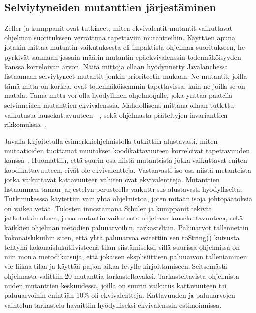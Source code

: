 \documentclass[finnish]{tktltiki2}
\begin{document}
\subsection{Selviytyneiden mutanttien järjestäminen}
Zeller ja kumppanit ovat tutkineet, miten ekvivalentit mutantit vaikuttavat ohjelman suoritukseen verrattuna tapettaviin mutantteihin. Käyttäen apuna jotakin mittaa mutantin vaikutuksesta eli impaktista ohjelman suoritukseen, he pyrkivät saamaan jossain määrin mutantin epäekvivalenssin todennäköisyyden kanssa korreloivan arvon. Näitä mittoja ollaan hyödynnetty Javalanchessa listaamaan selviytyneet mutantit jonkin prioriteetin mukaan. Ne mutantit, joilla tämä mitta on korkea, ovat todennäköisemmin tapettavissa, kuin ne joilla se on matala. Tämä mitta voi olla hyödyllinen ohjelmoijalle, joka yrittää päätellä selvinneiden mutanttien ekvivalenssia. Mahdollisena mittana ollaan tutkittu vaikutusta lausekattavuuteen~\cite{GrunSZ09}~\cite{SchulerZ10}, sekä ohjelmasta pääteltyjen invarianttien rikkomuksia~\cite{SchulerDZ09}.

Javalla kirjoitetulla esimerkkiohjelmistolla tutkittiin alustavasti, miten mutaatioiden tuottamat muutokset koodikattavuuteen korreloivat tapettavuuden kanssa~\cite{GrunSZ09}. Huomattiin, että suurin osa niistä mutanteista jotka vaikuttavat eniten koodikattavuuteen, eivät ole ekvivalentteja. Vastaavasti iso osa niistä mutanteista jotka vaikuttavat kattavuuteen vähiten ovat ekvivalentteja. Mutanttien listaaminen tämän järjestelyn perusteella vaikutti siis alustavasti hyödylliseltä. Tutkimukesssa käytettiin vain yhtä ohjelmistoa, joten mitään isoja johtopäätöksiä on vaikea vetää. Tulosten innostamana Schuler ja kumppanit tekivät jatkotutkimuksen, jossa mutantin vaikutusta ohjelman lausekattavuuteen, sekä kaikkien ohjelman metodien paluuarvoihin, tarkasteltiin. Paluuarvot tallennettin kokonaislukuihin siten, että yhtä paluuarvoa esitettiin sen toString() kutsusta tehtynä kokonaislukutiivisteenä tilan siistämiseksi, sillä suurissa ohjelmissa on niin monia metodikutsuja, että jokaisen eksplisiittisen paluuarvon tallentaminen vie liikaa tilaa ja käyttää paljon aikaa levylle kirjoittamiseen. Seitsemästä ohjelmasta valittiin 20 mutanttia tarkasteltavaksi. Tarkasteltavista ohjelmista niiden mutanttien keskuudessa, joilla on suurin vaikutus kattavuuteen tai paluuarvoihin enintään 10\% oli ekvivalentteja. Kattavuuden ja paluuarvojen vaihtelun tarkastelu havaittiin hyödylliseksi ekvivalenssin estimoinnissa.
\end{document}
